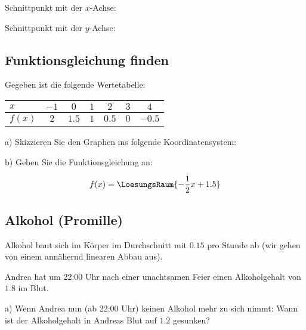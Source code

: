 Schnittpunkt mit der $x$-Achse: 

\vspace{5mm}
Schnittpunkt mit der $y$-Achse: 


\subsection{Funktionsgleichung finden}
Gegeben ist die folgende Wertetabelle:

\begin{tabular}{l|c|c|c|c|c|c|}
$x$    & $-1$ & $0$   & $1$ & $2$   & $3$ & $4$ \\\hline
$f(x)$ & $2$  & $1.5$ & $1$ & $0.5$ & $0$ & $-0.5$ \\
\end{tabular}

a) Skizzieren Sie den Graphen ins folgende Koordinatensystem:


b) Geben Sie die Funktionsgleichung an:

$$f(x) = \LoesungsRaum{-\frac12x+1.5}$$
\TNTeop{}
\subsection{Alkohol (Promille)}
Alkohol baut sich im Körper im Durchschnitt mit
$0.15$\textperthousand{} pro Stunde ab (wir gehen von einem annähernd
linearen Abbau aus).

Andrea hat um 22:00 Uhr nach einer unachtsamen Feier einen
Alkoholgehalt von $1.8$\textperthousand{} im Blut.

a) Wenn Andrea nun (ab 22:00 Uhr) keinen Alkohol mehr zu sich nimmt:
Wann ist der Alkoholgehalt in Andreas Blut auf $1.2$\textperthousand{}
gesunken?



